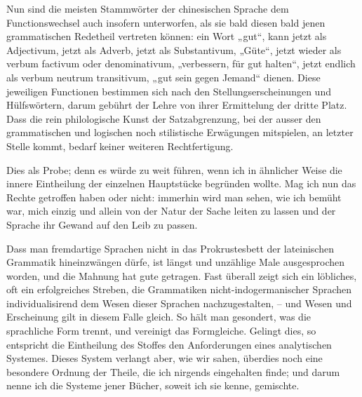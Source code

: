 Nun sind die meisten Stammwörter der chinesischen Sprache dem Functionswechsel auch insofern unterworfen, als sie bald diesen bald jenen grammatischen Redetheil vertreten können: ein Wort „gut“, kann jetzt als Adjectivum, jetzt als Adverb, jetzt als Substantivum, „Güte“, jetzt wieder als verbum factivum oder denominativum, „verbessern, für gut halten“, jetzt endlich als verbum neutrum transitivum, „gut sein gegen Jemand“ dienen. Diese jeweiligen Functionen bestimmen sich nach den Stellungserscheinungen und Hülfswörtern, darum gebührt der Lehre von ihrer Ermittelung der dritte Platz. Dass die rein philologische Kunst der Satzabgrenzung, bei der ausser den grammatischen und logischen noch stilistische Erwägungen mitspielen, an letzter Stelle kommt, bedarf keiner weiteren Rechtfertigung.

Dies als Probe; denn es würde zu weit führen, wenn ich in ähnlicher Weise die innere Eintheilung der einzelnen Hauptstücke begründen wollte. Mag ich nun das Rechte getroffen haben oder nicht: immerhin wird man sehen, wie ich bemüht war, mich einzig und allein von der Natur der Sache leiten zu lassen und der Sprache ihr Gewand auf den Leib zu passen.

Dass man fremdartige Sprachen nicht in das Prokrustesbett der lateinischen Grammatik hineinzwängen dürfe, ist längst und unzählige Male ausgesprochen worden, und die Mahnung hat gute  getragen. Fast überall zeigt sich ein löbliches, oft ein erfolgreiches Streben, \label{fp.94} die Grammatiken nicht-indo\-germa\-nischer Sprachen individualisirend dem Wesen dieser Sprachen nachzugestalten, – und Wesen und Erscheinung gilt in diesem Falle gleich. So hält man gesondert, was die sprachliche Form trennt, und vereinigt das Formgleiche. Gelingt dies, so entspricht die Eintheilung des Stoffes den Anforderungen eines analytischen Systemes. Dieses System verlangt aber, wie wir sahen, überdies noch eine besondere Ordnung der Theile, die ich nirgends eingehalten finde; und darum nenne ich die Systeme jener Bücher, soweit ich sie kenne, gemischte.

